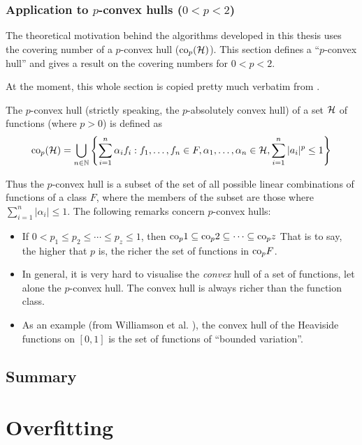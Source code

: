 \subsubsection{Application to $p$-convex hulls ($0 < p < 2$)}
\label{sec:p-convex}

The theoretical motivation behind the algorithms developed in this
thesis uses the covering number of a $p$-convex hull ($\mathrm{co}_p(\mathcal{H})$).
This section defines a ``$p$-convex hull'' and gives a result on the covering
numbers for $0 < p < 2$.  

At the moment, this whole section is copied pretty much verbatim from
\cite{Williamson99}.

The $p$-convex hull (strictly speaking, the $p$-absolutely convex hull) of
a set $\mathcal{H}$ of functions (where $p>0$) is defined as
%
\begin{equation}
\mathrm{co}_p (\mathcal{H}) =
 \bigcup _{n \in \mathbb{N}}
\left\{
 \sum_{i=1}^{n}
 \alpha _i
f_i : f_1, \ldots, f_n \in F,
 \alpha _1, \ldots, \alpha _n \in \mathbb{\mathcal{H}},
 \sum_{i=1}^{n} | a_i |^p \leq 1
\right\}
\end{equation}

Thus the $p$-convex hull is a subset of the set of all possible linear
combinations of functions of a class $F$, where the members of the
subset are those where $\sum_{i=1}^n |\alpha_i| \leq 1$.  The
following remarks concern $p$-convex hulls:
%
\begin{itemize}
\item	If $0 < p_1 \leq p_2 \leq \cdots \leq p_z \leq 1$, then
	$\mathrm{co}_p 1 \subseteq \mathrm{co}_p 2 \subseteq \cdots \subseteq \mathrm{co}_p z$
	That is to say, the higher that $p$ is, the richer the set of
	functions in $\mathrm{co}_p{F}$.
\item	In general, it is very hard to visualise the \emph{convex} hull
	of a set of functions, let alone the $p$-convex hull.  The
	convex hull is always richer than the function class.
\item	As an example (from Williamson et al. \cite{Williamson99}), the convex
	hull of the Heaviside functions on $[0, 1]$ is the set of
	functions of ``bounded variation''.
\end{itemize}

\subsection{Summary}



\section{Overfitting}
\label{sec:overfitting}

